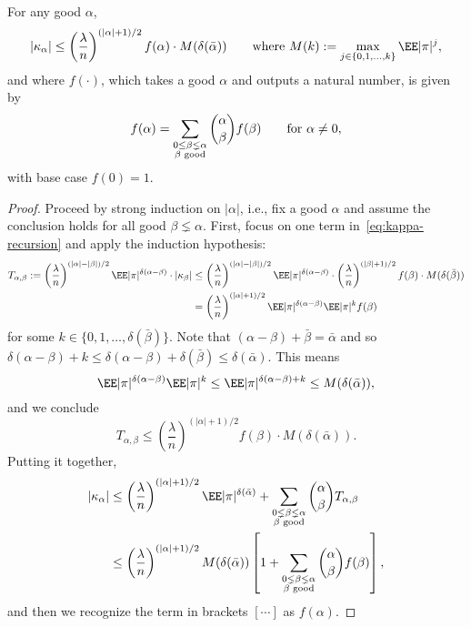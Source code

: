 \documentclass[11pt]{article}
\begin{document}
\begin{lemma}\label{lem:spiked:cumulant}
    For any good $\alpha$,
    \[ |\kappa_\alpha| \le \left(\frac{\lambda}{n}\right)^{(|\alpha|+1)/2} f(\alpha) \cdot M(\delta(\bar\alpha)) \qquad\text{where } M(k) := \max_{j \in \{0,1,\ldots,k\}} \EE|\pi|^j, \]
and where $f(\cdot)$, which takes a good $\alpha$ and outputs a natural number, is given by
\begin{equation}\label{eq:def:recursion:f}
f(\alpha)=\sum_{\substack{0 \le \beta\lneq\alpha \\ \beta \textnormal{ good}}}\binom{\alpha}{\beta} f(\beta) \qquad \text{for } \alpha \ne 0,
\end{equation}
with base case $f(0) = 1$.
\end{lemma}

\begin{proof}
Proceed by strong induction on $|\alpha|$, i.e., fix a good $\alpha$ and assume the conclusion holds for all good $\beta \lneq \alpha$. First, focus on one term in~\eqref{eq:kappa-recursion} and apply the induction hypothesis:
\begin{align*}
T_{\alpha,\beta} := \left(\frac{\lambda}{n}\right)^{(|\alpha|-|\beta|)/2} \EE|\pi|^{\delta(\alpha-\beta)} \cdot |\kappa_\beta| &\le \left(\frac{\lambda}{n}\right)^{(|\alpha|-|\beta|)/2} \EE|\pi|^{\delta(\alpha-\beta)} \cdot \left(\frac{\lambda}{n}\right)^{(|\beta|+1)/2} f(\beta) \cdot M(\delta(\bar\beta)) \\
&= \left(\frac{\lambda}{n}\right)^{(|\alpha|+1)/2} \EE|\pi|^{\delta(\alpha-\beta)} \EE|\pi|^k f(\beta)
\end{align*}
for some $k \in \{0,1,\ldots,\delta(\bar\beta)\}$. Note that $(\alpha-\beta) + \bar\beta = \bar\alpha$ and so $\delta(\alpha-\beta) + k \le \delta(\alpha-\beta) + \delta(\bar\beta) \le \delta(\bar\alpha)$. This means
\[ \EE|\pi|^{\delta(\alpha-\beta)} \EE|\pi|^k \le \EE|\pi|^{\delta(\alpha-\beta) + k} \le M(\delta(\bar\alpha)), \]
and we conclude
\[ T_{\alpha,\beta} \le \left(\frac{\lambda}{n}\right)^{(|\alpha|+1)/2} f(\beta) \cdot M(\delta(\bar\alpha)). \]
Putting it together,
\begin{align*}
|\kappa_\alpha| &\le \left(\frac{\lambda}{n}\right)^{(|\alpha|+1)/2} \EE|\pi|^{\delta(\bar\alpha)} + \sum_{\substack{0 \lneq \beta \lneq \alpha \\ \beta\text{ good}}} \binom{\alpha}{\beta} T_{\alpha,\beta} \\
&\le \left(\frac{\lambda}{n}\right)^{(|\alpha|+1)/2} M(\delta(\bar\alpha)) \left[1 + \sum_{\substack{0 \lneq \beta \lneq \alpha \\ \beta\text{ good}}} \binom{\alpha}{\beta} f(\beta) \right],
\end{align*}
and then we recognize the term in brackets $[\cdots]$ as $f(\alpha)$.
\end{proof}
\end{document}
